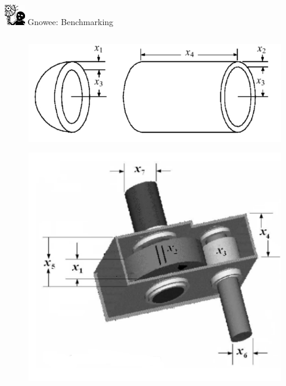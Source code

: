 \documentclass[xcolor=x11names,compress,handout]{beamer}
\renewcommand{\(}{\begin{columns}}
\renewcommand{\)}{\end{columns}}
\newcommand{\<}[1]{\begin{column}{#1}}
\renewcommand{\>}{\end{column}}
\begin{document}
\begin{frame}{\includegraphics[width=0.35in]{../figs/Gnowee.png} Gnowee: Benchmarking \cite{Walton2013a,Yang2014,Civicioglu2013}}
  \begin{columns}
    \begin{column}{0.33\linewidth} 
      \vspace{-.5cm} 
      \begin{figure}[htp]
        \centering
        \includegraphics[width=1.0\textwidth, height=0.18\textheight]{../figs/PressureVessel.png} 
      \end{figure}        
      \vspace{-0.75cm} 
      \begin{figure}[htp]
        \centering
        \includegraphics[width=1.0\textwidth, height=0.27\textheight]{../figs/SpeedReducer.png} 

\end{figure}
\end{column}
\end{columns}
\end{frame}
\end{document}
